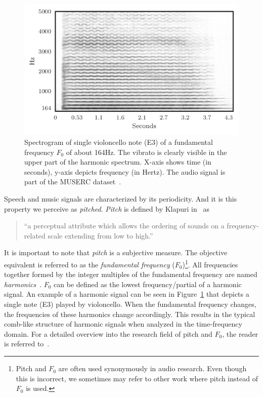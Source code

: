 \begin{figure}[h!]
  \centering
  \includegraphics[width=0.8\columnwidth]{Chapters/02_Fundamentals/figures/cello.pdf}
  \caption{Spectrogram of single violoncello note (E3) of a fundamental frequency \(F_0\) of about 164\si{\hertz}. The vibrato is clearly visible in the upper part of the harmonic spectrum. X-axis shows time (in seconds), y-axis depicts frequency (in Hertz). The audio signal is part of the MUSERC dataset~\cite{stoeter15acm}.}%
  \label{fig:cello_example}%
\end{figure}

Speech and music signals are characterized by its periodicity.
And it is this property we perceive as \emph{pitched}.
\emph{Pitch} is defined by Klapuri in~\cite{klapuri06book} as 

\begin{quote}
``a perceptual attribute which allows the ordering of sounds on a frequency-related scale extending from low to high.''
\end{quote}

It is important to note that \emph{pitch} is a subjective measure.
The objective equivalent is referred to as the \emph{fundamental frequency} (\(F_0\))\footnote{Pitch and $F_0$ are often used synonymously in audio research. 
Even though this is incorrect, we sometimes may refer to other work where pitch instead of $F_0$ is used.}.
All frequencies together formed by the integer multiples of the fundamental frequency are named \textit{harmonics}~\cite{schenker54}.
\(F_0\) can be defined as the lowest frequency/partial of a harmonic signal.
An example of a harmonic signal can be seen in Figure~\ref{fig:cello_example} that depicts a single note (E3) played by violoncello.
When the fundamental frequency changes, the frequencies of these harmonics change accordingly.
This results in the typical comb-like structure of harmonic signals when analyzed in the time-frequency domain.
For a detailed overview into the research field of pitch and \(F_0\), the reader is referred to~\cite{klapuri06book}.

